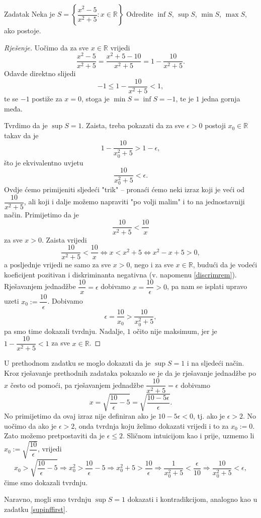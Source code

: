 \begin{exercise}{Zadatak}
Neka je \(S=\left\{\dfrac{x^2-5}{x^2+5} : x\in \mathbb{R}\right\}\) Odredite $\inf{S}$, $\sup{S}$, $\min{S}$, $\max{S}$, ako postoje.
\end{exercise}
\begin{proof}[Rješenje]
Uočimo da za sve $x\in \mathbb{R}$ vrijedi
$$\dfrac{x^2-5}{x^2+5}=\dfrac{x^2+5-10}{x^2+5}=1-\dfrac{10}{x^2+5}.$$
Odavde direktno slijedi
$$-1 \leq 1-\dfrac{10}{x^2+5}< 1,$$
te se $-1$ postiže za $x=0$, stoga je $\min{S}=\inf{S}=-1$, te je $1$ jedna gornja međa. 

Tvrdimo da je $\sup{S}=1$. Zaista, treba pokazati da za sve \(\epsilon>0\) postoji \(x_0\in \mathbb{R}\) takav da je 
\[1-\dfrac{10}{x_0^2+5}>1-\epsilon,\] 
što je ekvivalentno uvjetu \[\dfrac{10}{x_0^2+5}<\epsilon.\]
Ovdje ćemo primijeniti sljedeći "trik" -- pronaći ćemo neki izraz koji je veći od $\dfrac{10}{x^2+5}$, ali koji i dalje možemo napraviti "po volji malim" i to na jednostavniji način. Primijetimo da je \[\dfrac{10}{x^2+5}<\dfrac{10}{x}\] za sve \(x>0\). Zaista vrijedi
$$\dfrac{10}{x^2+5}<\dfrac{10}{x}\Leftrightarrow x<x^2+5\Leftrightarrow x^2-x+5>0,$$
a posljednje vrijedi ne samo za sve $x>0$, nego i za sve $x\in \mathbb{R}$, budući da je vodeći koeficijent pozitivan i diskriminanta negativna (v. napomenu \ref{discrimrem}).
Rješavanjem jednadžbe \(\dfrac{10}{x}=\epsilon\) dobivamo \(x=\dfrac{10}{\epsilon}>0\), pa nam se isplati upravo uzeti \(x_0:=\dfrac{10}{\epsilon}\). Dobivamo \[\epsilon=\dfrac{10}{x_0}>\dfrac{10}{x_0^2+5},\] pa smo time dokazali tvrdnju. Nadalje, $1$ očito nije maksimum, jer je $1-\dfrac{10}{x^2+5}<1$ za sve $x\in \mathbb{R}$.
\end{proof}
\begin{remark}
U prethodnom zadatku se moglo dokazati da je $\sup{S}=1$ i na sljedeći način. Kroz rješavanje prethodnih zadataka pokazalo se je da je rješavanje jednadžbe po \(x\) često od pomoći, pa rješavanjem jednadžbe \(\dfrac{10}{x^2+5}=\epsilon\) dobivamo \[x=\sqrt{\dfrac{10}{\epsilon}-5}=\sqrt{\dfrac{10-5\epsilon}{\epsilon}}.\] No primijetimo da ovaj izraz nije definiran ako je \(10-5\epsilon<0\), tj. ako je \(\epsilon>2\). No uočimo da ako je \(\epsilon>2\), onda tvrdnja koju želimo dokazati vrijedi i to za \(x_0:=0\). Zato možemo pretpostaviti da je \(\epsilon\leq 2\). Sličnom intuicijom kao i prije, uzmemo li \(x_0:=\sqrt{\dfrac{10}{\epsilon}}\),
vrijedi
\[x_0>\sqrt{\dfrac{10}{\epsilon}-5}\Rightarrow x_0^2>\dfrac{10}{\epsilon}-5\Rightarrow x_0^2+5>\dfrac{10}{\epsilon}\Rightarrow \dfrac{1}{x_0^2+5}<\dfrac{\epsilon}{10}\Rightarrow \dfrac{10}{x_0^2+5}<\epsilon,\]
čime smo dokazali tvrdnju.

Naravno, mogli smo tvrdnju $\sup{S}=1$ dokazati i kontradikcijom, analogno kao u zadatku \ref{supinffirst}.
\end{remark}
